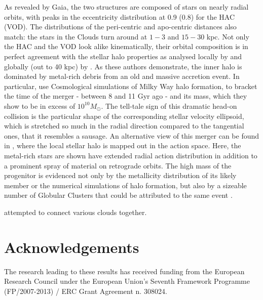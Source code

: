 \documentclass[fleqn,usenatbib]{mnras}
\begin{document}
As revealed by Gaia, the two structures are composed of stars on
nearly radial orbits, with peaks in the eccentricity distribution at
0.9 (0.8) for the HAC (VOD). The distributions of the peri-centric and
apo-centric distances also match: the stars in the Clouds turn around
at $1-3$ and $15-30$ kpc. Not only the HAC and the VOD look alike
kinematically, their orbital composition is in perfect agreement with
the stellar halo properties as analysed locally by
\citet{Belokurov2018} and globally (out to 40 kpc) by
\citet{Deason2018pileup}. As these authors demonstrate, the inner halo
is dominated by metal-rich debris from an old and massive accretion
event. In particular, \citet{Belokurov2018} use Cosmological
simulations of Milky Way halo formation, to bracket the time of the
merger - between 8 and 11 Gyr ago - and its mass, which they show to
be in excess of $10^{10} M_{\odot}$. The tell-tale sign of this
dramatic head-on collision is the particular shape of the
corresponding stellar velocity ellipsoid, which is stretched so much
in the radial direction compared to the tangential ones, that it
resembles a sausage. An alternative view of this merger can be found
in \citet{actionhalo}, where the local stellar halo is mapped out in
the action space. Here, the metal-rich stars are shown have extended
radial action distribution in addition to a prominent spray of
material on retrograde orbits. The high mass of the progenitor is
evidenced not only by the metallicity distribution of its likely
member or the numerical simulations of halo formation, but also by a
sizeable number of Globular Clusters that could be attributed to the
same event \citep[see][]{sausagegc}.

\citet{Jo2012} attempted to connect various clouds together.

\section*{Acknowledgements}

The research leading to these results has received funding from the
European Research Council under the European Union's Seventh Framework
Programme (FP/2007-2013) / ERC Grant Agreement n. 308024.





\bsp	%
\label{lastpage}
\end{document}
